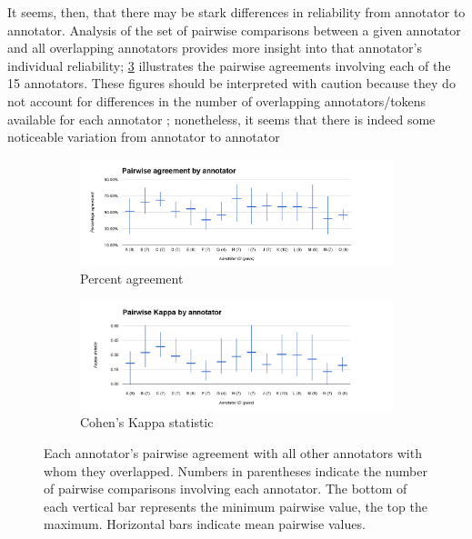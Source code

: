 	 It seems, then, that there may be stark differences in reliability from annotator to annotator. Analysis of the set of pairwise comparisons between a given annotator and all overlapping annotators provides more insight into that annotator's individual reliability; \cref{fig:agreement:annotators} illustrates the pairwise agreements involving each of the 15 annotators. These figures should be interpreted with caution because they do not account for differences in the number of overlapping annotators/tokens available for each annotator ; nonetheless, it seems that there is indeed some noticeable variation from annotator to annotator 
		
		\begin{figure}[htb]
			\centering
			
			\begin{subfigure}[b]{\textwidth}
				\centering
				\includegraphics[width=\textwidth]{img/annotation/pairAgreeAnnotators}
				\caption{Percent agreement}
				\label{fig:agreement:annotators:pct}
			\end{subfigure}%
			
			\begin{subfigure}[b]{\textwidth}
				\centering
				\includegraphics[width=\textwidth]{img/annotation/pairKappaAnnotators}
				\caption{Cohen's Kappa statistic}
				\label{fig:agreement:annotators:k}
			\end{subfigure}%
			
			\caption[Pairwise agreement statistics by annotator]{Each annotator's pairwise agreement with all other annotators with whom they overlapped. Numbers in parentheses indicate the number of pairwise comparisons involving each annotator. The bottom of each vertical bar represents the minimum pairwise value, the top the maximum. Horizontal bars indicate mean pairwise values.}
			\label{fig:agreement:annotators}
		\end{figure}
		
